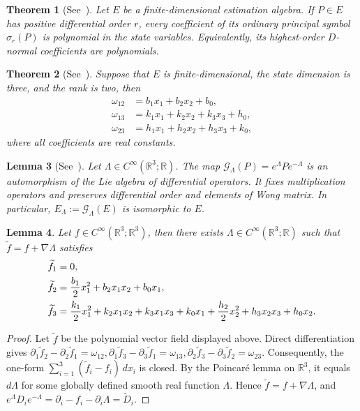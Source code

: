 \documentclass{tCON2e}
\newenvironment{revision}{\begingroup\color{black}}{\endgroup}
\numberwithin{equation}{section}
\theoremstyle{journalplain}
\newtheorem{theorem}{Theorem}[section]
\newtheorem{lemma}[theorem]{Lemma}
\theoremstyle{journaldef}
\newenvironment{revision}{}{}
\begin{document}
\begin{revision}
\begin{theorem}[See~\citep{Shi2017Finite}]\label{thm:top-coeff}
Let $E$ be a finite-dimensional estimation algebra. If $P\in E$ has
positive differential order $r$, every coefficient of its ordinary
principal symbol $\sigma_r(P)$ is polynomial in the state variables.
Equivalently, its highest-order $D$-normal coefficients are polynomials.
\end{theorem}

\begin{theorem}[See~\citep{Shi2017Finite}]\label{thm:shi-yau-affine}
Suppose that $E$ is finite-dimensional, the state dimension is three,
and the rank is two, then
\begin{align}
\omega_{12} &= b_1x_1+b_2x_2+b_0, \\
\omega_{13} &= k_1x_1+k_2x_2+k_3x_3+h_0, \\
\omega_{23} &= h_1x_1+h_2x_2+h_3x_3+k_0,
\end{align}
where all coefficients are real constants.
\end{theorem}

\begin{lemma}[See~\citep{Shi2017Finite}]\label{prop:gauge}
Let $\Lambda\in C^\infty(\mathbb R^3;\mathbb R)$. The map
\(
\mathcal G_\Lambda(P)=e^\Lambda P e^{-\Lambda}
\)
is an automorphism of the Lie algebra of differential operators.
It fixes multiplication operators and preserves differential
order and elements of Wong matrix. In particular,
\(
E_\Lambda:=\mathcal G_\Lambda(E)
\)
is isomorphic to $E$.
\end{lemma}

\begin{lemma}\label{lem:polynomial-drift}
Let $f\in C^\infty(\mathbb R^3;\mathbb R^3)$, then there exists
$\Lambda\in C^\infty(\mathbb R^3;\mathbb R)$ such that
$\widetilde f=f+\nabla\Lambda$ satisfies
\begin{align}
\widetilde f_1&=0,\notag\\
\widetilde f_2
&=\frac{b_1}{2}x_1^2+b_2x_1x_2+b_0x_1,
\label{eq:f2-general}\\
\widetilde f_3
&=\frac{k_1}{2}x_1^2+k_2x_1x_2+k_3x_1x_3+k_0x_1
+\frac{h_2}{2}x_2^2+h_3x_2x_3+h_0x_2.
\label{eq:f3-general}
\end{align}
\end{lemma}

\begin{proof}
Let $\widetilde f$ be the polynomial vector field displayed above.
Direct differentiation gives
\(
\partial_1\widetilde f_2-\partial_2\widetilde f_1=\omega_{12},
\partial_1\widetilde f_3-\partial_3\widetilde f_1=\omega_{13},
\partial_2\widetilde f_3-\partial_3\widetilde f_2=\omega_{23}.
\)
Consequently, the one-form
\(
\sum_{i=1}^{3}(\widetilde f_i-f_i)\,dx_i
\)
is closed. By the Poincar\'e lemma on $\mathbb R^3$, it equals
$d\Lambda$ for some globally defined smooth real function
$\Lambda$. Hence $\widetilde f=f+\nabla\Lambda$, and
\(
e^\Lambda D_i e^{-\Lambda}
=
\partial_i-f_i-\partial_i\Lambda
=
\widetilde D_i.
\)
\end{proof}



\end{revision}
\end{document}
